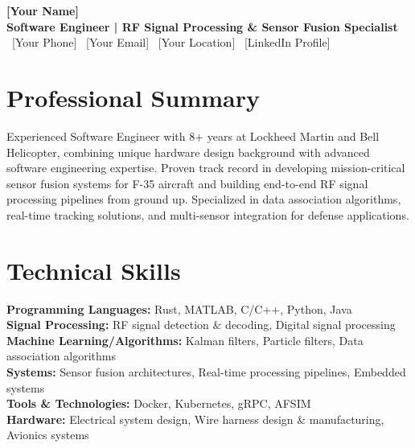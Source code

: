 \documentclass[11pt,a4paper]{article}
\begin{document}
\begin{center}
    {\Huge \textbf{[Your Name]}} \\
    \vspace{2pt}
    {\Large \textbf{Software Engineer | RF Signal Processing \& Sensor Fusion Specialist}} \\
    \vspace{8pt}
    \faPhone\ [Your Phone] \quad
    \faEnvelope\ [Your Email] \quad
    \faMapMarker\ [Your Location] \quad
    \faLinkedin\ [LinkedIn Profile]
\end{center}

\vspace{-10pt}

\section{Professional Summary}
Experienced Software Engineer with 8+ years at Lockheed Martin and Bell Helicopter, combining unique hardware design background with advanced software engineering expertise. Proven track record in developing mission-critical sensor fusion systems for F-35 aircraft and building end-to-end RF signal processing pipelines from ground up. Specialized in data association algorithms, real-time tracking solutions, and multi-sensor integration for defense applications.

\section{Technical Skills}
\begin{itemize}[leftmargin=0.15in, label={}]
    \small{\item{
        \textbf{Programming Languages:} Rust, MATLAB, C/C++, Python, Java \\
        \textbf{Signal Processing:} RF signal detection \& decoding, Digital signal processing \\
        \textbf{Machine Learning/Algorithms:} Kalman filters, Particle filters, Data association algorithms\\
        \textbf{Systems:} Sensor fusion architectures, Real-time processing pipelines, Embedded systems \\
        \textbf{Tools \& Technologies:} Docker, Kubernetes, gRPC, AFSIM\\
        \textbf{Hardware:} Electrical system design, Wire harness design \& manufacturing, Avionics systems
    }}
\end{itemize}
\end{document}
